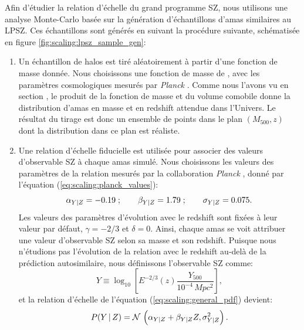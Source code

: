 Afin d'étudier la relation d'échelle du grand programme SZ, nous utilisons une analyse Monte-Carlo basée sur la génération d'échantillons d'amas similaires au LPSZ.
Ces échantillons sont générés en suivant la procédure suivante, schématisée en figure \ref{fig:scaling:lpsz_sample_gen}:
\begin{enumerate}[leftmargin=*]
    \item Un échantillon de halos est tiré aléatoirement à partir d'une fonction de masse donnée.
        Nous choisissons une fonction de masse de , avec les paramètres cosmologiques mesurés par \textit{Planck} \cite{planck_collaboration_planck_2020}.
        Comme nous l'avons vu en section , le produit de la fonction de masse et du volume comobile donne la distribution d'amas en masse et en redshift attendue dans l'Univers.
        Le résultat du tirage est donc un ensemble de points dans le plan $(M_{500}, z)$ dont la distribution dans ce plan est réaliste.
    \item Une relation d'échelle fiducielle est utilisée pour associer des valeurs d'observable SZ à chaque amas simulé.
        Nous choisissons les valeurs des paramètres de la relation mesurés par la collaboration \textit{Planck} \cite{planck_collaboration_planck_2011,planck_collaboration_planck_2014}, donné par l'équation (\ref{eq:scaling:planck_values}):
        \begin{equation}
            \alpha_{Y|Z} = -0.19\;; \qquad \beta_{Y|Z} = 1.79\;; \qquad \sigma_{Y|Z} = 0.075.
        \end{equation}
        Les valeurs des paramètres d'évolution avec le redshift sont fixées à leur valeur par défaut, $\gamma = -2/3$ et $\delta = 0$.
        Ainsi, chaque amas se voit attribuer une valeur d'observable SZ selon sa masse et son redshift.
        Puisque nous n'étudions pas l'évolution de la relation avec le redshift au-delà de la prédiction autosimilaire, nous définissons l'observable SZ comme:
        \begin{equation}
            Y \equiv \log_{10} \left[E^{-2/3}(z) \frac{Y_{500}}{10^{-4} \,\unit{Mpc^2}}\right],
        \end{equation}
        et la relation d'échelle de l'équation (\ref{eq:scaling:general_pdf}) devient:
        \begin{equation}
            \label{eq:scaling:general_pdf_noz}
            P({Y\,|\,Z}) = \mathcal{N}\, \left(\alpha_{Y|Z} + \beta_{Y|Z} Z, \sigma_{Y|Z}^2 \right).
        \end{equation}

\end{enumerate}
